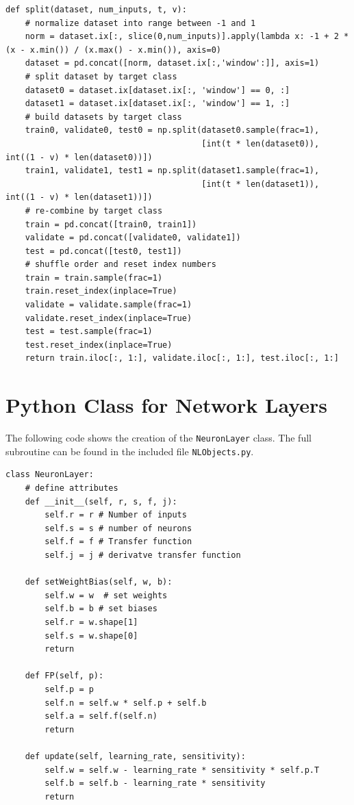 \documentclass[12pt,halfline,a4paper]{ouparticle}
\begin{document}
\begin{lstlisting}[style = Python]
def split(dataset, num_inputs, t, v):
    # normalize dataset into range between -1 and 1
    norm = dataset.ix[:, slice(0,num_inputs)].apply(lambda x: -1 + 2 * (x - x.min()) / (x.max() - x.min()), axis=0)
    dataset = pd.concat([norm, dataset.ix[:,'window':]], axis=1)
    # split dataset by target class
    dataset0 = dataset.ix[dataset.ix[:, 'window'] == 0, :]
    dataset1 = dataset.ix[dataset.ix[:, 'window'] == 1, :]
    # build datasets by target class
    train0, validate0, test0 = np.split(dataset0.sample(frac=1),
                                        [int(t * len(dataset0)), int((1 - v) * len(dataset0))])
    train1, validate1, test1 = np.split(dataset1.sample(frac=1),
                                        [int(t * len(dataset1)), int((1 - v) * len(dataset1))])
    # re-combine by target class
    train = pd.concat([train0, train1])
    validate = pd.concat([validate0, validate1])
    test = pd.concat([test0, test1])
    # shuffle order and reset index numbers
    train = train.sample(frac=1)
    train.reset_index(inplace=True)
    validate = validate.sample(frac=1)
    validate.reset_index(inplace=True)
    test = test.sample(frac=1)
    test.reset_index(inplace=True)
    return train.iloc[:, 1:], validate.iloc[:, 1:], test.iloc[:, 1:]
\end{lstlisting} 
\pagebreak

\section{Python Class for Network Layers}
The following code shows the creation of the \verb|NeuronLayer| class. The full subroutine can be found in the included file \verb|NLObjects.py|.

\begin{lstlisting}[style = Python]
class NeuronLayer:
    # define attributes
    def __init__(self, r, s, f, j):
        self.r = r # Number of inputs
        self.s = s # number of neurons
        self.f = f # Transfer function
        self.j = j # derivatve transfer function

    def setWeightBias(self, w, b):
        self.w = w  # set weights
        self.b = b # set biases
        self.r = w.shape[1]
        self.s = w.shape[0]
        return

    def FP(self, p):
        self.p = p
        self.n = self.w * self.p + self.b
        self.a = self.f(self.n)
        return

    def update(self, learning_rate, sensitivity):
        self.w = self.w - learning_rate * sensitivity * self.p.T
        self.b = self.b - learning_rate * sensitivity
        return
\end{lstlisting} 
\pagebreak
\end{document}
